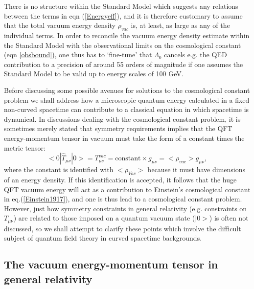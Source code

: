 \documentclass[12pt]{article}
\def\ss{\subsection}
\begin{document}
There is no structure within the Standard Model which suggests any
relations between the terms in eqn (\ref{Energyeff}), and it is
therefore customary to assume that the total vacuum energy density
$\rho_{vac}$ is, at least, as large as any of the individual
terms. In order to reconcile the vacuum energy density estimate
within the Standard Model with the observational limits on the
cosmological constant (eqn \ref{obsbound}), one thus has to
`fine-tune' that $\Lambda _0$ cancels e.g. the QED contribution to
a precision of around 55 orders of magnitude if one assumes the
Standard Model to be valid up to energy scales of 100 GeV.

Before discussing some possible avenues for solutions to the cosmological
constant problem we shall address how a microscopic 
quantum energy calculated in a fixed non-curved spacetime can 
contribute to a classical equation in which spacetime is dynamical.
In discussions dealing with the cosmological constant problem, it
is sometimes merely stated that symmetry requirements implies that the
QFT energy-momentum tensor in vacuum must take the form of
a constant times the metric tensor:
\begin{equation} \label{tmn}
<0|\hat{T}_{\mu \nu}|0>= T^{vac}_{\mu\nu} = \mbox{constant} 
\times g_{\mu \nu} = 
< \rho_{vac} > g_{\mu \nu},
\end{equation} 
where the constant is identified with $ <\rho_{Vac}>$ because it
must have dimensions of an energy density. If this identification
is accepted, it follows that the huge QFT vacuum energy will act
as a contribution to Einstein's cosmological constant in
eq.(\ref{Einstein1917}), and one is thus lead to a cosmological
constant problem. However, just how symmetry constraints in
general relativity (e.g. constraints on $T_{\mu\nu}$) are related
to those imposed on a quantum vacuum state ($|0>$) is often not
discussed, so we shall attempt to clarify these points which
involve the difficult subject of quantum field theory in curved
spacetime backgrounds. 

\ss{The vacuum energy-momentum tensor in general relativity}
\end{document}
